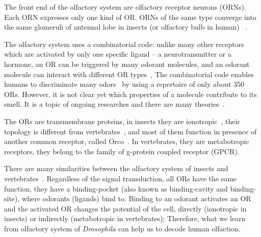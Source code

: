 \documentclass[11pt]{paper} %
\begin{document}
The front end of the olfactory system are olfactory receptor neurons (ORNs).  
Each ORN expresses only one kind of OR. 
ORNs of the same type converge into the same glomeruli of antennal lobe in insects (or olfactory bulb in human)
~\cite{root2007,Carey2011,Vosshall2000,Couto2005,fishilevich2005,gao2000,wang1998,mombaerts1996,vassar1994}.

The olfactory system uses a combinatorial code: 
unlike many other receptors which are activated by only one specific ligand -- a neurotransmitter or a hormone,
an OR can be triggered by many odorant molecules, 
and an odorant molecule can interact with different OR types~\cite{Malnic2000},
The combinatorial code enables humans to discriminate many odors~\cite{Bushdid2014} by using a repertoire of only about 350 ORs.
However, it is not clear yet which properties of a molecule contribute to its smell. 
It is a topic of ongoing researches and there are many theories~\cite{Turin,Keller2004,Araneda2000,Brookes2007,Franco2011,Pelz2006,Gabler2013,Schmuker2007,Haddad2008,Snitz2013,Yablonka2012,gane2013}.

The ORs are transmembrane proteins, 
in insects they are ionotropic~\cite{Sato2008,Wicher2008,Nagel2011,Rong2011}, 
their topology is different from vertebrates~\cite{Benton2006,Smart2008},
and most of them function in presence of another common receptor, called Orco~\cite{Larsson2004}.
In vertebrates, they are metabotropic receptors, they belong to the family of g-protein coupled receptor (GPCR). 

There are many similarities between the olfactory system of insects and vertebrates~\cite{Wilson2014,Kaupp2010}.
Regardless of the signal transduction, 
all ORs have the same function, they have a binding-pocket (also known as binding-cavity and binding-site),
where odorants (ligands) bind to. 
Binding to an odorant activates an OR and 
the activated OR changes the potential of the cell, 
directly (ionotropic in insects) or indirectly (metabotropic in vertebrates);
Therefore, what we learn from olfactory system of \textit{Drosophila} can help us to decode human olfaction. 

\end{document}
